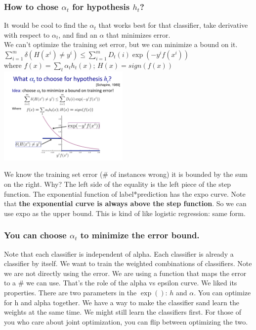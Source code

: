 \subsubsection{How to chose $\alpha_t$ for hypothesis $h_t$?}
It would be cool to find the $\alpha_t$ that works best for that classifier, take derivative with respect to $\alpha_t$, and find an $\alpha$ that minimizes error. \hfill \\
We can't optimize the training set error, but we can minimize a bound on it. \hfill \\
$\displaystyle  \sum_{i=1}^m \delta(H(x^i) \neq y^i) \leq \sum_{i=1}^m D_t(i) \exp(-y^i f(x^i))$ \hfill \\
where $\displaystyle f(x) = \sum_t \alpha_t h_t(x)$; $H(x) = sign(f(x))$ \hfill \\
\includegraphics[width=2.5in]{figures/chosing_alpha_step_func.pdf}
 
We know the training set error (\# of instances wrong) it is bounded by the sum on the right.
Why?  The left side of the equality is the left piece of the step function.
The exponential function of label*prediction has the expo curve.
Note that \textbf{the exponential curve is always above the step function}.
So we can use expo as the upper bound. 
This is kind of like logistic regression: same form.

\subsubsection{You can choose $\alpha_t$ to minimize the error bound.}
Note that each classifier is independent of alpha.  
Each classifier is already a classifier by itself. 
We want to train the weighted combinations of classifiers.  
Note we are not directly using the error.  
We are using a function that maps the error to a \# we can use. 
That's the role of the alpha vs epsilon curve.  
We liked its properties. 
There are two parameters in the $\exp()$:  $h$ and $\alpha.$
You can optimize for h and alpha together.
We have a way to make the classifier sand learn the weights at the same time.
We might still learn the classifiers first. 
For those of you who care about joint optimization, you can flip between optimizing the two. 

